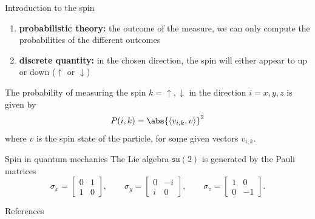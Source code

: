 \documentclass[9pt]{beamer}
\renewcommand{\emph}{\alert}
\begin{document}
{\begin{frame}{Introduction to the spin}
\begin{enumerate}
the direction in which we want to measure it
        \item \textbf{probabilistic theory:} the outcome of the measure, we can only compute the probabilities of the different outcomes
        \item \textbf{discrete quantity:} in the chosen direction, the spin will either appear to up or down ($\uparrow$ or $\downarrow$)
    \end{enumerate}
    The probability of measuring the spin $k=\uparrow,\downarrow$ in the direction $i=x,y,z$ is given by
    \begin{equation}
        P(i,k) = \abs{\langle v_{i,k},v \rangle}^2
    \end{equation}
    where $v$ is the spin state of the particle, for some given vectors $v_{i,k}$.

\end{frame}

\begin{frame}{Spin in quantum mechanics}
    The Lie algebra $\mathfrak{su}(2)$ is generated by the \emph{Pauli matrices}
    \begin{equation}
        \sigma_x =
        \begin{bmatrix}
            0 & 1\\
            1 & 0
        \end{bmatrix},\qquad
        \sigma_y =
        \begin{bmatrix}
            0 & -i\\
            i & 0
        \end{bmatrix},\qquad
        \sigma_z =
        \begin{bmatrix}
            1 & 0\\
            0 & -1
        \end{bmatrix}.
    \end{equation}
    
\end{frame}

}

\begin{frame}[allowframebreaks]{References}




\end{frame}
\end{document}
